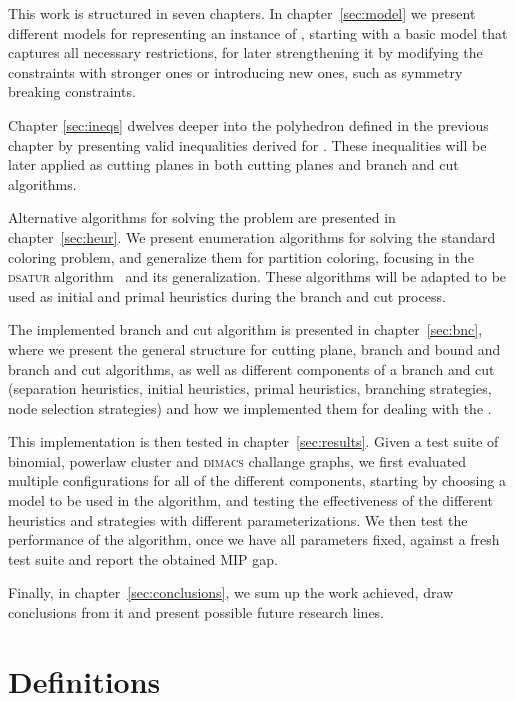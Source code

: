 This work is structured in seven chapters. In chapter~\ref{sec:model} we present different models for representing an instance of \PCP{}, starting with a basic model that captures all necessary restrictions, for later strengthening it by modifying the constraints with stronger ones or introducing new ones, such as symmetry breaking constraints.

Chapter \ref{sec:ineqs} dwelves deeper into the polyhedron defined in the previous chapter by presenting valid inequalities derived for \PCP{}. These inequalities will be later applied as cutting planes in both cutting planes and branch and cut algorithms.

Alternative algorithms for solving the problem are presented in chapter~\ref{sec:heur}. We present enumeration algorithms for solving the standard coloring problem, and generalize them for partition coloring, focusing in the \textsc{dsatur} algorithm~\cite{brelaz1979new} and its generalization. These algorithms will be adapted to be used as initial and primal heuristics during the branch and cut process.

The implemented branch and cut algorithm is presented in chapter~\ref{sec:bnc}, where we present the general structure for cutting plane, branch and bound and branch and cut algorithms, as well as different components of a branch and cut (separation heuristics, initial heuristics, primal heuristics, branching strategies, node selection strategies) and how we implemented them for dealing with the \PCP{}.

This implementation is then tested in chapter~\ref{sec:results}. Given a test suite of binomial, powerlaw cluster and \textsc{dimacs} challange graphs, we first evaluated multiple configurations for all of the different components, starting by choosing a model to be used in the algorithm, and testing the effectiveness of the different heuristics and strategies with different parameterizations. We then test the performance of the algorithm, once we have all parameters fixed, against a fresh test suite and report the obtained MIP gap.

Finally, in chapter~\ref{sec:conclusions}, we sum up the work achieved, draw conclusions from it and present possible future research lines.

\section{Definitions}
\label{subsec:intro:definitions}

